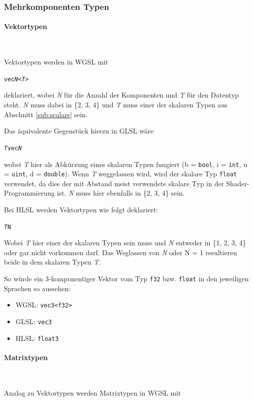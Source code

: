 \documentclass[oneside]{ausarbeitung}
\begin{document}
\subsubsection{Mehrkomponenten Typen}
\paragraph{Vektortypen} \

Vektortypen werden in WGSL mit 

\texttt{vec\textit{N}<\textit{T}>}

deklariert, wobei \textit{N} für die Anzahl der Komponenten und \textit{T} für den Datentyp steht. \textit{N} muss dabei in \{2, 3, 4\} und \textit{T} muss einer der skalaren Typen aus Abschnitt \ref{sub:scalars} sein.

Das äquivalente Gegenstück hierzu in GLSL wäre 

\texttt{\textit{T}vec\textit{N}}

wobei \textit{T} hier als Abkürzung eines skalaren Typen fungiert (b = \texttt{bool}, i = \texttt{int}, u = \texttt{uint}, d = \texttt{double}). Wenn \textit{T} weggelassen wird, wird der skalare Typ \texttt{float} verwendet, da dies der mit Abstand meist verwendete skalare Typ in der Shader-Programmierung ist. \textit{N} muss hier ebenfalls in \{2, 3, 4\} sein.

Bei HLSL werden Vektortypen wie folgt deklariert:

\texttt{\textit{T}\texttt{N}}

Wobei \textit{T} hier einer der skalaren Typen sein muss und \textit{N} entweder in \{1, 2, 3, 4\} oder gar nicht vorkommen darf. Das Weglassen von \textit{N} oder N = 1 resultieren beide in dem skalaren Typen \textit{T}.

So würde ein 3-komponentiger Vektor vom Typ \texttt{f32} bzw. \texttt{float} in den jeweiligen Sprachen so aussehen:
\begin{itemize}
 \item WGSL: \texttt{vec3<f32>}
 \item GLSL: \texttt{vec3}
 \item HLSL: \texttt{float3}
\end{itemize}

\paragraph{Matrixtypen} \

Analog zu Vektortypen werden Matrixtypen in WGSL mit
\end{document}
